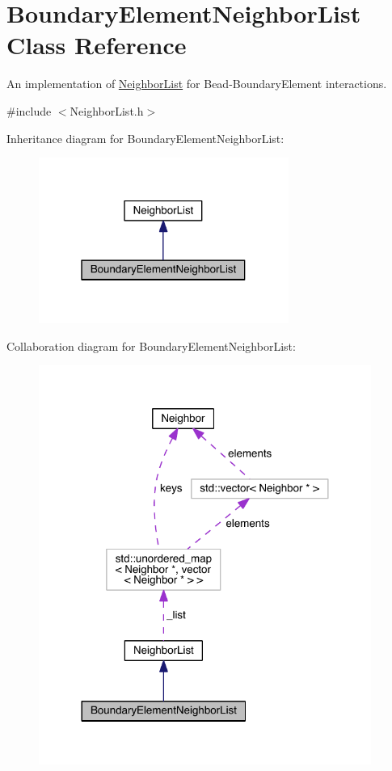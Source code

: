 \hypertarget{classBoundaryElementNeighborList}{\section{Boundary\+Element\+Neighbor\+List Class Reference}
\label{classBoundaryElementNeighborList}
}


An implementation of \hyperlink{classNeighborList}{Neighbor\+List} for Bead-\/\+Boundary\+Element interactions.  




{\ttfamily \#include $<$Neighbor\+List.\+h$>$}



Inheritance diagram for Boundary\+Element\+Neighbor\+List\+:\nopagebreak
\begin{figure}[H]
\begin{center}
\leavevmode
\includegraphics[width=232pt]{classBoundaryElementNeighborList__inherit__graph}
\end{center}
\end{figure}


Collaboration diagram for Boundary\+Element\+Neighbor\+List\+:\nopagebreak
\begin{figure}[H]
\begin{center}
\leavevmode
\includegraphics[width=308pt]{classBoundaryElementNeighborList__coll__graph}
\end{center}
\end{figure}
